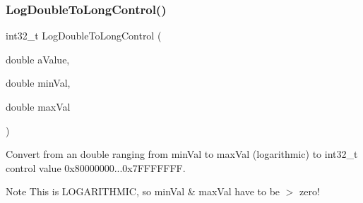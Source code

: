 \subsubsection{\texorpdfstring{LogDoubleToLongControl()}{LogDoubleToLongControl()}}
{\footnotesize\ttfamily int32\+\_\+t Log\+Double\+To\+Long\+Control (\begin{DoxyParamCaption}\item[{double}]{a\+Value,  }\item[{double}]{min\+Val,  }\item[{double}]{max\+Val }\end{DoxyParamCaption})}



Convert from an double ranging from min\+Val to max\+Val (logarithmic) to int32\+\_\+t control value 0x80000000...0x7\+F\+F\+F\+F\+F\+FF. 

\begin{DoxyNote}{Note}
This is L\+O\+G\+A\+R\+I\+T\+H\+M\+IC, so min\+Val \& max\+Val have to be $>$ zero! 
\end{DoxyNote}

